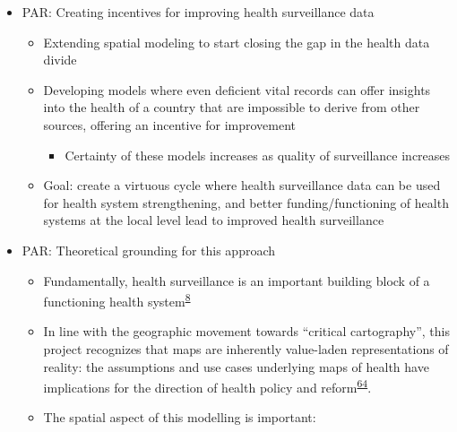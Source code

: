 \documentclass[
]{article}
\providecommand{\tightlist}{%
  \setlength{\itemsep}{0pt}\setlength{\parskip}{0pt}}
\begin{document}
\begin{itemize}
\tightlist
\item
  PAR: Creating incentives for improving health surveillance data

  \begin{itemize}
  \tightlist
  \item
    Extending spatial modeling to start closing the gap in the health data divide
  \item
    Developing models where even deficient vital records can offer insights into the
    health of a country that are impossible to derive from other sources, offering an
    incentive for improvement

    \begin{itemize}
    \tightlist
    \item
      Certainty of these models increases as quality of surveillance increases
    \end{itemize}
  \item
    Goal: create a virtuous cycle where health surveillance data can be used for
    health system strengthening, and better funding/functioning of health systems at the
    local level lead to improved health surveillance
  \end{itemize}
\item
  PAR: Theoretical grounding for this approach

  \begin{itemize}
  \tightlist
  \item
    Fundamentally, health surveillance is an important building block of a functioning
    health system\textsuperscript{\protect\hyperlink{ref-Roberts2008}{8}}
  \item
    In line with the geographic movement towards ``critical cartography'', this project
    recognizes that maps are inherently value-laden representations of reality: the
    assumptions and use cases underlying maps of health have implications for the direction
    of health policy and reform\textsuperscript{\protect\hyperlink{ref-Crampton2006}{64}}.
  \item
    The spatial aspect of this modelling is important:


\end{itemize}
\end{itemize}
\end{document}
